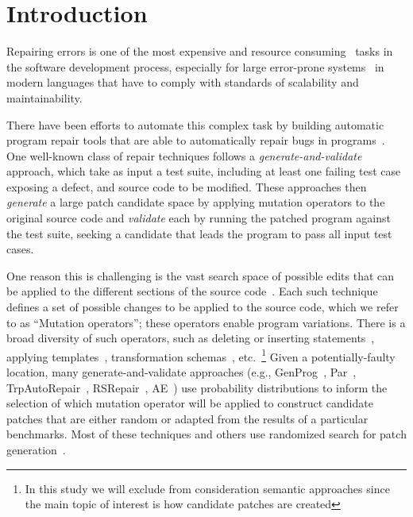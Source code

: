 \documentclass[conference]{IEEEtran}
\begin{document}
\section{Introduction} \label{introduction}
Repairing errors is one of the most expensive\cite{Tassey02,Britton13} and 
resource consuming~\cite{Weiss07} tasks in 
the software development process, especially for large error-prone systems~\cite{Liblit03,Anvik05} in modern languages that have to comply with standards of scalability and 
maintainability.

There have been efforts to automate this complex task by 
building automatic program repair tools that are able to automatically repair 
bugs in 
programs~\cite{legoues12,kim2013,Weimer13,fan15,long15,debroy10,perkins09,wei10}. 
One well-known class of repair techniques follows a 
\emph{generate-and-validate} approach, which take as input a test suite, 
including at
least one failing test case exposing
a defect, and source code to be 
modified.  These approaches then \emph{generate} a large patch candidate space 
by applying 
mutation operators to the original source code and \emph{validate} each by
running the patched  program against the test suite, seeking a candidate that
leads the program to pass all input test cases. 

One reason this is challenging is the vast search space of possible 
edits that can be applied to the different sections of the source 
code~\cite{long16}. Each such technique defines  a set of possible changes to be
applied to the source code, which we refer to as ``Mutation operators''; these 
operators enable program variations.
There is a broad diversity of such operators, such as deleting or inserting 
statements~\cite{legoues12}, applying templates~\cite{kim2013}, transformation 
schemas~\cite{fan15}, etc.~\footnote{In this study we will exclude 
from 
consideration semantic approaches since the main topic of interest is how 
candidate patches are created} 
Given a potentially-faulty location, many
generate-and-validate approaches (e.g., GenProg~\cite{legoues12}, 
Par~\cite{kim2013}, TrpAutoRepair~\cite{Qi13}, RSRepair~\cite{Qi14},
AE~\cite{Weimer13}) use probability distributions to inform the selection of 
which mutation operator
will be applied to construct candidate patches that are either random or adapted
from the results of a particular benchmarks. Most of these techniques and others 
use randomized search for patch 
generation~\cite{arcuri08,bradbury10,Qi14,Weimer13}.
\end{document}
